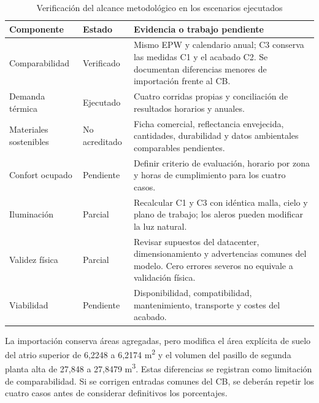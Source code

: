 \begin{table}[H]\centering
\caption{Verificación del alcance metodológico en los escenarios ejecutados}
{\small\singlespacing\renewcommand{\arraystretch}{1.2}
\begin{tabular}{p{3.2cm}p{2.1cm}p{8.1cm}}\toprule
Componente & Estado & Evidencia o trabajo pendiente \\ \midrule
Comparabilidad & Verificado & Mismo EPW y calendario anual; C3 conserva las medidas C1 y el acabado C2. Se documentan diferencias menores de importación frente al CB. \\
Demanda térmica & Ejecutado & Cuatro corridas propias y conciliación de resultados horarios y anuales. \\
Materiales sostenibles & No acreditado & Ficha comercial, reflectancia envejecida, cantidades, durabilidad y datos ambientales comparables pendientes. \\
Confort ocupado & Pendiente & Definir criterio de evaluación, horario por zona y horas de cumplimiento para los cuatro casos. \\
Iluminación & Parcial & Recalcular C1 y C3 con idéntica malla, cielo y plano de trabajo; los aleros pueden modificar la luz natural. \\
Validez física & Parcial & Revisar supuestos del datacenter, dimensionamiento y advertencias comunes del modelo. Cero errores severos no equivale a validación física. \\
Viabilidad & Pendiente & Disponibilidad, compatibilidad, mantenimiento, transporte y costes del acabado. \\
\bottomrule\end{tabular}}
\end{table}
La importación conserva áreas agregadas, pero modifica el área explícita de suelo del atrio superior de 6,2248 a 6,2174 m\textsuperscript{2} y el volumen del pasillo de segunda planta alta de 27,848 a 27,8479 m\textsuperscript{3}. Estas diferencias se registran como limitación de comparabilidad. Si se corrigen entradas comunes del CB, se deberán repetir los cuatro casos antes de considerar definitivos los porcentajes.
\par\medskip

